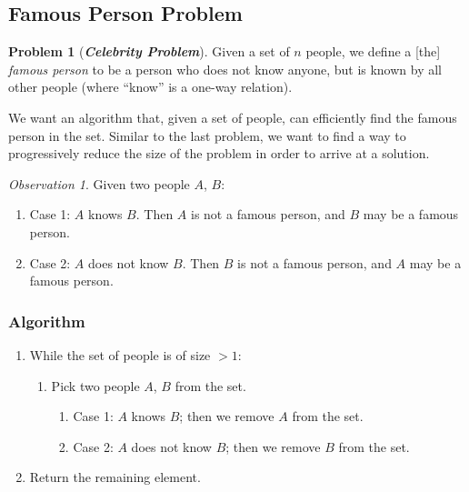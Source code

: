 \documentclass[12pt]{extarticle}
\theoremstyle{definition}
\newtheorem*{problem}{Problem}
\theoremstyle{remark}
\newtheorem*{observation}{Observation}
\newcommand{\probname}[1]{\noindent \textbf{\textit{#1}}}
\begin{document}
\pagebreak
\subsection{Famous Person Problem}
\begin{problem}[\probname{Celebrity Problem}]
    Given a set of $n$ people, we define a [the] \textit{famous person} to be a person who does not know anyone, but is known by all other people (where “know” is a one-way relation).
\end{problem}

We want an algorithm that, given a set of people, can efficiently find the famous person in the set. Similar to the last problem, we want to find a way to progressively reduce the size of the problem in order to arrive at a solution.

\vspace{12pt}
\begin{observation}
    Given two people $A$, $B$: \begin{enumerate}
        \item Case 1: $A$ knows $B$. Then $A$ is not a famous person, and $B$ may be a famous person.
        \item Case 2: $A$ does not know $B$. Then $B$ is not a famous person, and $A$ may be a famous person.
    \end{enumerate}
\end{observation}

\subsubsection*{Algorithm}
\begin{enumerate}
    \item While the set of people is of size $>1$: \begin{enumerate}
        \item Pick two people $A$, $B$ from the set. \begin{enumerate}
            \item Case 1: $A$ knows $B$; then we remove $A$ from the set.
            \item Case 2: $A$ does not know $B$; then we remove $B$ from the set.
        \end{enumerate}
    \end{enumerate}
    \item Return the remaining element.
\end{enumerate}
\end{document}
